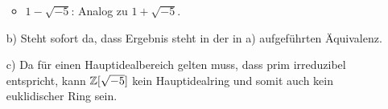 \begin{loes}
\begin{enumerate}
\begin{itemize}
			\item $ 1 - \sqrt{-5} $: 
			Analog zu $ 1 + \sqrt{-5} $. 
		\end{itemize}
		
		\item[b)]
		Steht sofort da, dass Ergebnis steht in der in a) aufgeführten Äquivalenz.
		
		\item[c)] 
		Da für einen Hauptidealbereich gelten muss, dass prim irreduzibel entspricht, kann $ \mathbb{Z}[\sqrt{-5}] $ kein Hauptidealring und somit auch kein euklidischer Ring sein.
	\end{enumerate}
\end{loes}